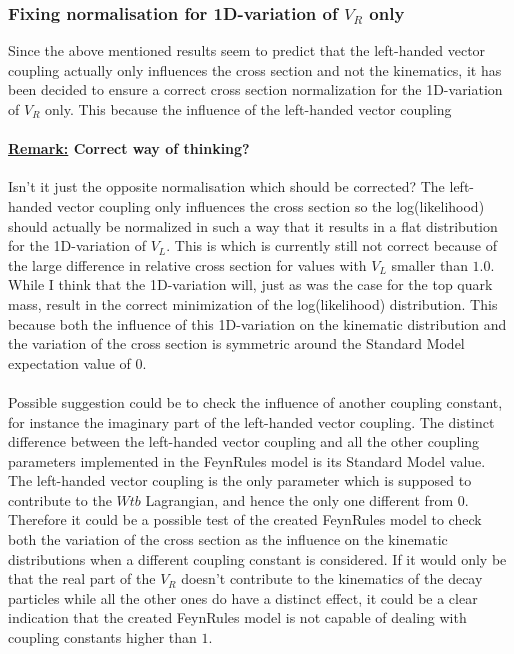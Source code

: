 \subsubsection{Fixing normalisation for 1D-variation of $V_R$ only}
Since the above mentioned results seem to predict that the left-handed vector coupling actually only influences the cross section and not the kinematics, it has been decided to ensure a correct cross section normalization for the 1D-variation of $V_R$ only. This because the influence of the left-handed vector coupling \\

\paragraph{\underline{Remark:} Correct way of thinking?\\}
Isn't it just the opposite normalisation which should be corrected? The left-handed vector coupling only influences the cross section so the log(likelihood) should actually be normalized in such a way that it results in a flat distribution for the 1D-variation of $V_L$. This is which is currently still not correct because of the large difference in relative cross section for values with $V_L$ smaller than $1.0$. While I think that the 1D-variation will, just as was the case for the top quark mass, result in the correct minimization of the log(likelihood) distribution. This because both the influence of this 1D-variation on the kinematic distribution and the variation of the cross section is symmetric around the Standard Model expectation value of $0$.\\
\\
Possible suggestion could be to check the influence of another coupling constant, for instance the imaginary part of the left-handed vector coupling. The distinct difference between the left-handed vector coupling and all the other coupling parameters implemented in the FeynRules model is its Standard Model value. The left-handed vector coupling is the only parameter which is supposed to contribute to the $Wtb$ Lagrangian, and hence the only one different from $0$. Therefore it could be a possible test of the created FeynRules model to check both the variation of the cross section as the influence on the kinematic distributions when a different coupling constant is considered. If it would only be that the real part of the $V_R$ doesn't contribute to the kinematics of the decay particles while all the other ones do have a distinct effect, it could be a clear indication that the created FeynRules model is not capable of dealing with coupling constants higher than $1$.\\
\\
